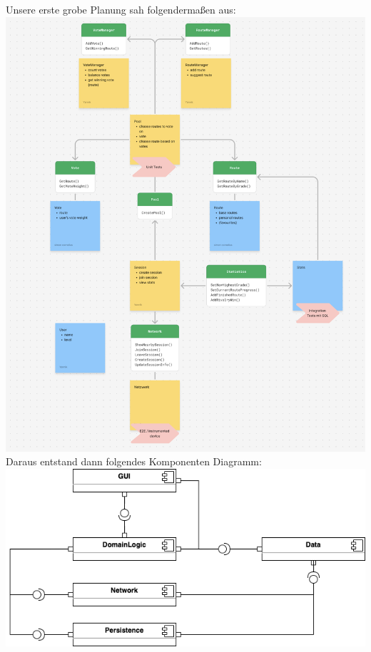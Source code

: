 \documentclass[11pt,a4paper,headsepline,footsepline,bibliography=totocnumbered]{article}
\begin{document}
  \par
    Unsere erste grobe Planung sah folgendermaßen aus:
    \newline
    \includegraphics[width=\textwidth]{pictures/planning.png}
    \newpage
    Daraus entstand dann folgendes Komponenten Diagramm:
    \newline
    \includegraphics[width=\textwidth]{pictures/component_diagram.drawio.png}
\end{document}

